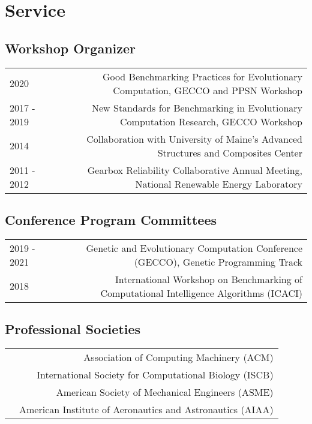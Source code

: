 \section*{Service}

\subsection*{Workshop Organizer}
\begin{tabular}{L!{\VRule}R}
2020        & Good Benchmarking Practices for Evolutionary Computation, GECCO and PPSN Workshop  \\
2017 - 2019 & New Standards for Benchmarking in Evolutionary Computation Research, GECCO Workshop  \\
2014        & Collaboration with University of Maine's Advanced Structures and Composites Center  \\
2011 - 2012 & Gearbox Reliability Collaborative Annual Meeting, National Renewable Energy Laboratory  \\
\end{tabular}

\subsection*{Conference Program Committees} 
\begin{tabular}{L!{\VRule}R}
2019 - 2021 & Genetic and Evolutionary Computation Conference (GECCO), Genetic Programming Track \\
2018        & International Workshop on Benchmarking of Computational Intelligence Algorithms (ICACI) \\
\end{tabular}

\subsection*{Professional Societies} 
\begin{tabular}{L!{\VRule}R}
        & Association of Computing Machinery (ACM) \\
        & International Society for Computational Biology (ISCB) \\
        & American Society of Mechanical Engineers (ASME) \\
        & American Institute of Aeronautics and Astronautics (AIAA) \\
\end{tabular}

